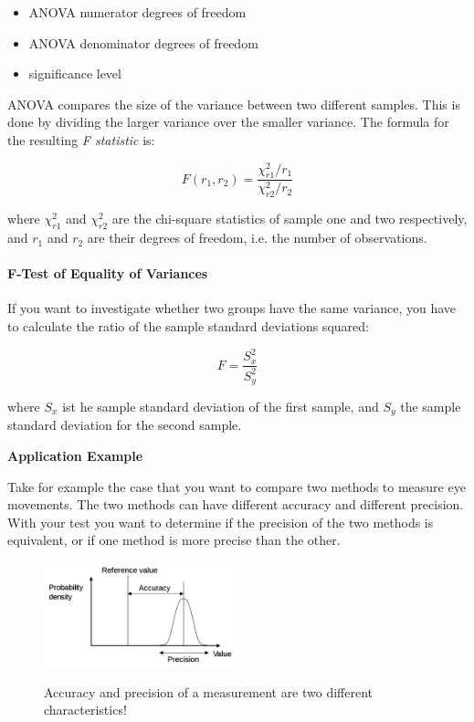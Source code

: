 \begin{itemize}
  \item ANOVA numerator degrees of freedom
  \item ANOVA denominator degrees of freedom
  \item significance level
\end{itemize}

ANOVA compares the size of the variance between two different samples. This is done by dividing the larger variance over the smaller variance. The formula for the resulting \emph{F statistic} is:

\begin{equation}
    F(r_1, r_2) = \frac{\chi_{r1} ^2 /r_1}{\chi_{r2} ^2 /r_2}
\end{equation}

where $\chi_{r1}^2$ and $\chi_{r2}^2$ are the chi-square statistics of sample one and two respectively, and $r_1$ and $r_2$ are their degrees of freedom, i.e. the number of observations.

\paragraph{F-Test of Equality of Variances}
If you want to investigate whether two groups have the same variance, you have to calculate the ratio of the sample standard deviations squared:

\begin{equation}
  F = \frac{S_x^2}{S_y^2}
\end{equation}

where $S_x$ ist he sample standard deviation of the first sample, and $S_y$ the sample standard deviation for the second sample.

\textbf{Application Example}

Take for example the case that you want to compare two methods to measure eye movements. The two methods
can have different accuracy and different precision. With your test you want to
determine if the precision of the two methods is equivalent, or if one
method is more precise than the other.

\begin{figure}
  \centering
  \includegraphics[width=0.5\textwidth]{../Images/Accuracy_and_precision.png}\\
  \caption{Accuracy and precision of a measurement are two different characteristics!}
\end{figure}

